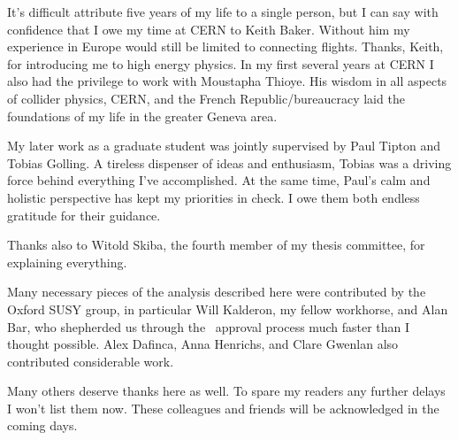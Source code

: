 

It's difficult attribute five years of my life to a single person, but I can say with confidence that I owe my time at CERN to Keith Baker.
Without him my experience in Europe would still be limited to connecting flights.
Thanks, Keith, for introducing me to high energy physics.
In my first several years at CERN I also had the privilege to work with Moustapha Thioye.
His wisdom in all aspects of collider physics, CERN, and the French Republic/bureaucracy laid the foundations of my life in the greater Geneva area.

My later work as a graduate student was jointly supervised by Paul Tipton and Tobias Golling.
A tireless dispenser of ideas and enthusiasm, Tobias was a driving force behind everything I've accomplished.
At the same time, Paul's calm and holistic perspective has kept my priorities in check.
I owe them both endless gratitude for their guidance.

Thanks also to Witold Skiba, the fourth member of my thesis committee, for explaining everything.

Many necessary pieces of the analysis described here were contributed by the Oxford SUSY group, in particular Will Kalderon, my fellow workhorse, and Alan Bar, who shepherded us through the \atlas\ approval process much faster than I thought possible.
Alex Dafinca, Anna Henrichs, and Clare Gwenlan also contributed considerable work.

Many others deserve thanks here as well.
To spare my readers any further delays I won't list them now.
These colleagues and friends will be acknowledged in the coming days.








